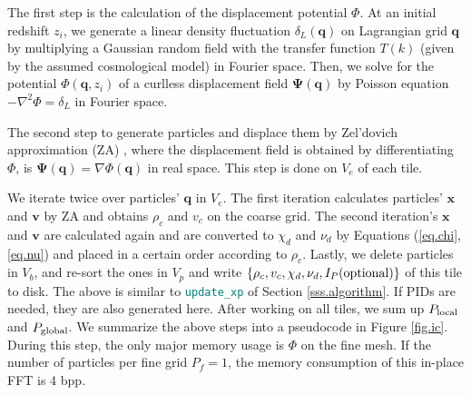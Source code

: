 \documentclass[10pt,twocolumn,reprint]{emulateapj}
\newcommand{\bs}{\boldsymbol}
\newcommand{\tcx}{\textcolor{teal}}
\begin{document}
The first step is the calculation of the displacement potential $\Phi$. At an initial redshift $z_i$, we generate a linear density fluctuation $\delta_L({\bs q})$ on Lagrangian grid ${\bs q}$ by multiplying a Gaussian random field with the transfer function $T(k)$ (given by the assumed cosmological model) in Fourier space. Then, we solve for the potential ${\Phi({\bs q}, z_i)}$ of a curlless displacement field ${\bs\Psi({\bs q})}$ by Poisson equation $-\nabla^2\Phi=\delta_L$ in Fourier space.

The second step to generate particles and displace them by Zel'dovich approximation (ZA) \citep{1970A&A.....5...84Z}, where the displacement field is obtained by differentiating $\Phi$, is ${\bs \Psi}({\bs q})=\nabla\Phi({\bs q})$ in real space. This step is done on $V_e$ of each tile. 

We iterate twice over particles' ${\bs q}$ in $V_e$. The first iteration calculates particles' ${\bs x}$ and ${\bs v}$ by ZA and obtains $\rho_c$ and $v_c$ on the coarse grid. The second iteration's ${\bs x}$ and ${\bs v}$ are calculated again and are converted to $\chi_d$ and $\nu_d$ by Equations (\ref{eq.chi},\ref{eq.nu}) and placed in a certain order according to $\rho_c$. Lastly, we delete particles in $V_b$, and re-sort the ones in $V_p$ and write $\{\rho_c,v_c,\chi_d,\nu_d,I_P({\rm optional})\}$ of this tile to disk. The above is similar to {\tt \tcx{update\_xp}} of Section \ref{sss.algorithm}. If PIDs are needed, they are also generated here.
After working on all tiles, we sum up $P_{\rm local}$ and $P_{\rm global}$. We summarize the above steps into a pseudocode in Figure \ref{fig.ic}. During this step, the only major memory usage is $\Phi$ on the fine mesh. If the number of particles per fine grid $P_f=1$, the memory consumption of this in-place FFT is 4 bpp.
\end{document}

